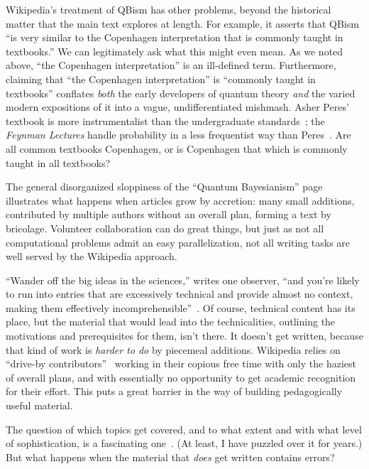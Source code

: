 \documentclass[aps,pra,superscriptaddress,12pt,tightenlines,nofootinbib]{revtex4}
\begin{document}
Wikipedia's treatment of QBism has other problems, beyond the
historical matter that the main text explores at length.  For example,
it asserts that QBism ``is very similar to the Copenhagen
interpretation that is commonly taught in textbooks.''  We can
legitimately ask what this might even mean.  As we noted above, ``the
Copenhagen interpretation'' is an ill-defined term.  Furthermore,
claiming that ``the Copenhagen interpretation'' is ``commonly taught
in textbooks'' conflates \emph{both} the early developers of quantum
theory \emph{and} the varied modern expositions of it into a vague,
undifferentiated mishmash.  Asher Peres' textbook is more
instrumentalist than the undergraduate standards~\cite{Peres-book};
the \emph{Feynman Lectures} handle probability in a less frequentist
way than Peres~\cite{FeynmanLP}.  Are all common textbooks Copenhagen, or is
Copenhagen that which is commonly taught in all textbooks?

The general disorganized sloppiness of the ``Quantum Bayesianism''
page illustrates what happens when articles grow by accretion: many
small additions, contributed by multiple authors without an overall
plan, forming a text by bricolage.  Volunteer collaboration can do
great things, but just as not all computational problems admit an easy
parallelization, not all writing tasks are well served by the
Wikipedia approach.

``Wander off the big ideas in the sciences,'' writes one observer,
``and you're likely to run into entries that are excessively technical
and provide almost no context, making them effectively
incomprehensible''~\cite{Timmer2015}.  Of course, technical content
has its place, but the material that would lead into the
technicalities, outlining the motivations and prerequisites for them,
isn't there.  It doesn't get written, because that kind of work is
\emph{harder to do} by piecemeal additions.  Wikipedia relies on
``drive-by contributors''~\cite{Shulman2016} working in their copious
free time with only the haziest of overall plans, and with essentially
no opportunity to get academic recognition for their effort.  This
puts a great barrier in the way of building pedagogically useful
material.

The question of which topics get covered, and to what extent and with
what level of sophistication, is a fascinating one~\cite{Giaimo2016}.
(At least, I have puzzled over it for years.)  But what happens when
the material that \emph{does} get written contains errors?
\end{document}
